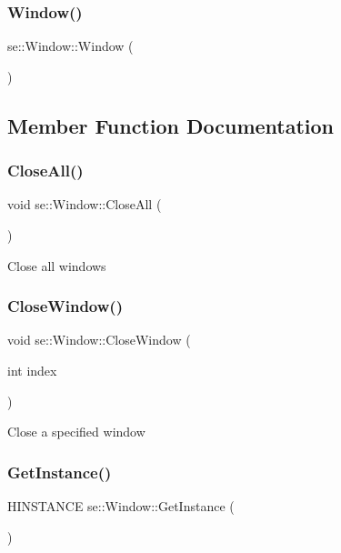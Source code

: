 \subsubsection{\texorpdfstring{Window()}{Window()}}
{\footnotesize\ttfamily se\+::\+Window\+::\+Window (\begin{DoxyParamCaption}{ }\end{DoxyParamCaption})}



\subsection{Member Function Documentation}
\mbox{\label{classse_1_1_window_aa36e57777577f2b0cf355461b3b0f9a3}} 
\subsubsection{\texorpdfstring{Close\+All()}{CloseAll()}}
{\footnotesize\ttfamily void se\+::\+Window\+::\+Close\+All (\begin{DoxyParamCaption}{ }\end{DoxyParamCaption})}

Close all windows \mbox{\label{classse_1_1_window_aab3319947ce4e9cd78f16cd9be9481e5}} 
\subsubsection{\texorpdfstring{Close\+Window()}{CloseWindow()}}
{\footnotesize\ttfamily void se\+::\+Window\+::\+Close\+Window (\begin{DoxyParamCaption}\item[{int}]{index }\end{DoxyParamCaption})}

Close a specified window \mbox{\label{classse_1_1_window_af85337c4cc5eae56412a5bbcbf471ae6}} 
\subsubsection{\texorpdfstring{Get\+Instance()}{GetInstance()}}
{\footnotesize\ttfamily H\+I\+N\+S\+T\+A\+N\+CE se\+::\+Window\+::\+Get\+Instance (\begin{DoxyParamCaption}{ }\end{DoxyParamCaption})}

